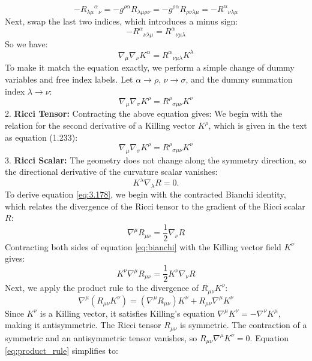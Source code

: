 \documentclass[11pt, a4paper]{report}
\begin{document}
$$- R_{\lambda\mu}{}^{\alpha}{}_{\nu} = - g^{\rho\alpha} R_{\lambda\mu\rho\nu} = - g^{\rho\alpha} R_{\rho\nu\lambda\mu} = - R^{\alpha}{}_{\nu\lambda\mu}$$
Next, swap the last two indices, which introduces a minus sign:
$$- R^{\alpha}{}_{\nu\lambda\mu} = R^{\alpha}{}_{\nu\mu\lambda}$$
So we have:
$$\nabla_{\mu} \nabla_{\nu} K^{\alpha} = R^{\alpha}{}_{\nu\mu\lambda} K^{\lambda}$$
To make it match the equation  exactly, we perform a simple change of dummy variables and free index labels. Let $\alpha \to \rho$, $\nu \to \sigma$, and the dummy summation index $\lambda \to \nu$:
$$\nabla_{\mu} \nabla_{\sigma} K^{\rho} = R^{\rho}{}_{\sigma\mu\nu} K^{\nu}$$
2.  \textbf{Ricci Tensor:} Contracting the above equation gives:
    We begin with the relation for the second derivative of a Killing vector $K^\rho$, which is given in the text as equation (1.233):
    \begin{equation}
        \nabla_\mu \nabla_\sigma K^\rho = R^\rho{}_{\sigma\mu\nu} K^\nu
    \end{equation}
3.  \textbf{Ricci Scalar:} The geometry does not change along the symmetry direction, so the directional derivative of the curvature scalar vanishes:
    \begin{equation}
    K^\lambda \nabla_\lambda R = 0.
    \end{equation}
To derive equation \eqref{eq:3.178}, we begin with the contracted Bianchi identity, which relates the divergence of the Ricci tensor to the gradient of the Ricci scalar $R$:
\begin{equation} \nabla^\mu R_{\mu\nu} = \frac{1}{2} \nabla_\nu R \label{eq:bianchi} \end{equation}
Contracting both sides of equation \eqref{eq:bianchi} with the Killing vector field $K^\nu$ gives:
\begin{equation} K^\nu \nabla^\mu R_{\mu\nu} = \frac{1}{2} K^\nu \nabla_\nu R \label{eq:contracted_bianchi} \end{equation}
Next, we apply the product rule to the divergence of $R_{\mu\nu} K^\nu$:
\begin{equation} \nabla^\mu (R_{\mu\nu} K^\nu) = (\nabla^\mu R_{\mu\nu}) K^\nu + R_{\mu\nu} \nabla^\mu K^\nu \label{eq:product_rule} \end{equation}
Since $K^\nu$ is a Killing vector, it satisfies Killing's equation $\nabla^\mu K^\nu = -\nabla^\nu K^\mu$, making it antisymmetric. The Ricci tensor $R_{\mu\nu}$ is symmetric. The contraction of a symmetric and an antisymmetric tensor vanishes, so $R_{\mu\nu} \nabla^\mu K^\nu = 0$. Equation \eqref{eq:product_rule} simplifies to:
\end{document}
